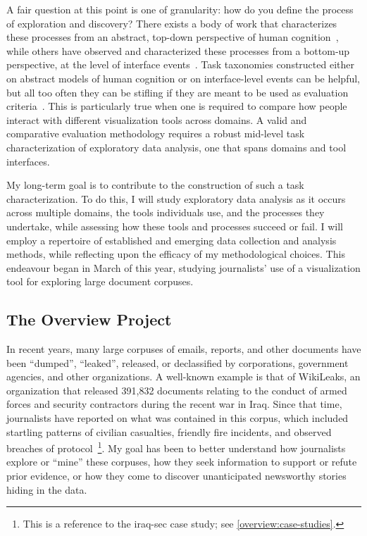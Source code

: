 A fair question at this point is one of granularity: how do you define the process of exploration and discovery? 
There exists a body of work that characterizes these processes from an abstract, top-down perspective of human cognition~\cite{Amar2004,Pirolli2009,Springmeyer1992,Valiati2006}, while others have observed and characterized these processes from a bottom-up perspective, at the level of interface events~\cite{Amar2005,Shneiderman1996,Valiati2006,Winckler2004}. 
Task taxonomies constructed either on abstract models of human cognition or on interface-level events can be helpful, but all too often they can be stifling if they are meant to be used as evaluation criteria~\cite{Beaudouin-Lafon2004}. 
This is particularly true when one is required to compare how people interact with different visualization tools across domains. 
A valid and comparative evaluation methodology requires a robust mid-level task characterization of exploratory data analysis, one that spans domains and tool interfaces. 

My long-term goal is to contribute to the construction of such a task characterization. 
To do this, I will study exploratory data analysis as it occurs across multiple domains, the tools individuals use, and the processes they undertake, while assessing how these tools and processes succeed or fail. 
I will employ a repertoire of established and emerging data collection and analysis methods, while reflecting upon the efficacy of my methodological choices.
This endeavour began in March of this year, studying journalists' use of a visualization tool for exploring large document corpuses. 

\subsection{The Overview Project}
\label{app:overview:prelim-overview}

In recent years, many large corpuses of emails, reports, and other documents have been ``dumped'', ``leaked'', released, or declassified by corporations, government agencies, and other organizations. 
A well-known example is that of WikiLeaks, an organization that released 391,832 documents relating to the conduct of armed forces and security contractors during the recent war in Iraq. 
Since that time, journalists have reported on what was contained in this corpus, which included startling patterns of civilian casualties, friendly fire incidents, and observed breaches of protocol~\cite{Stray2012}\footnote{This is a reference to the {\sc iraq-sec} case study; see \autoref{overview:case-studies}.}. 
My goal has been to better understand how journalists explore or ``mine'' these corpuses, how they seek information to support or refute prior evidence, or how they come to discover unanticipated newsworthy stories hiding in the data. 

